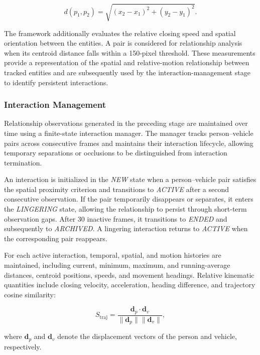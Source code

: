\documentclass[runningheads]{llncs}
\begin{document}
\begin{equation}
d(p_1,p_2)=
\sqrt{(x_2-x_1)^2+(y_2-y_1)^2}.
\end{equation}

The framework additionally evaluates the relative closing speed and
spatial orientation between the entities. A pair is considered for
relationship analysis when its centroid distance falls within a
150-pixel threshold. These measurements provide a representation of the
spatial and relative-motion relationship between tracked entities and
are subsequently used by the interaction-management stage to identify
persistent interactions.

\subsubsection{Interaction Management}

Relationship observations generated in the preceding stage are maintained
over time using a finite-state interaction manager. The manager tracks
person--vehicle pairs across consecutive frames and maintains their
interaction lifecycle, allowing temporary separations or occlusions to be
distinguished from interaction termination.

An interaction is initialized in the \textit{NEW} state when a person--vehicle
pair satisfies the spatial proximity criterion and transitions to
\textit{ACTIVE} after a second consecutive observation. If the pair
temporarily disappears or separates, it enters the \textit{LINGERING} state,
allowing the relationship to persist through short-term observation gaps.
After 30 inactive frames, it transitions to \textit{ENDED} and subsequently
to \textit{ARCHIVED}. A lingering interaction returns to \textit{ACTIVE} when
the corresponding pair reappears.

For each active interaction, temporal, spatial, and motion histories are
maintained, including current, minimum, maximum, and running-average
distances, centroid positions, speeds, and movement headings. Relative
kinematic quantities include closing velocity, acceleration, heading
difference, and trajectory cosine similarity:

\begin{equation}
S_{\mathrm{traj}} =
\frac{\mathbf{d}_{p}\cdot\mathbf{d}_{v}}
{\|\mathbf{d}_{p}\|\|\mathbf{d}_{v}\|},
\end{equation}

where $\mathbf{d}_{p}$ and $\mathbf{d}_{v}$ denote the displacement vectors
of the person and vehicle, respectively.
\end{document}
